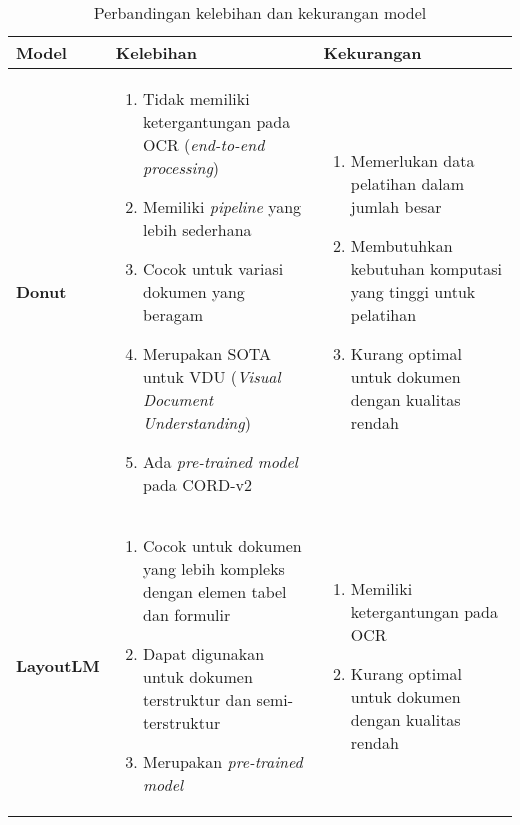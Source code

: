 \begin{table}[h!]
\caption{Perbandingan kelebihan dan kekurangan model}
\label{tab:model-comparison}
\begin{tabularx}{\linewidth}{|p{2cm}|X|X|}
\hline
\textbf{Model} & \textbf{Kelebihan} & \textbf{Kekurangan} \\
\hline

\textbf{Donut} &
\begin{enumerate}
    \item Tidak memiliki ketergantungan pada OCR (\textit{end-to-end processing})
    \item Memiliki \textit{pipeline} yang lebih sederhana
    \item Cocok untuk variasi dokumen yang beragam
    \item Merupakan SOTA untuk VDU (\textit{Visual Document Understanding})
    \item Ada \textit{pre-trained model} pada \dataset{} CORD-v2
\end{enumerate}
&
\begin{enumerate}
    \item Memerlukan data pelatihan dalam jumlah besar
    \item Membutuhkan kebutuhan komputasi yang tinggi untuk pelatihan
    \item Kurang optimal untuk dokumen dengan kualitas rendah
\end{enumerate}
\\ \hline
\textbf{LayoutLM} &
\begin{enumerate}
    \item Cocok untuk dokumen yang lebih kompleks dengan elemen tabel dan formulir
    \item Dapat digunakan untuk dokumen terstruktur dan semi-terstruktur
    \item Merupakan \textit{pre-trained model}
\end{enumerate}
&
\begin{enumerate}
    \item Memiliki ketergantungan pada OCR
    \item Kurang optimal untuk dokumen dengan kualitas rendah
\end{enumerate}
\\ \hline


\end{tabularx}
\end{table}
